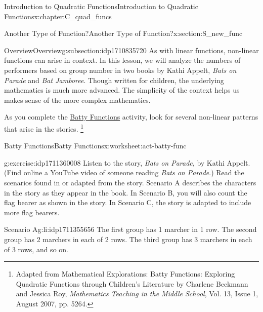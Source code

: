 \documentclass[oneside,10pt,]{book}
\newcommand{\pubtitle}[1]{\textsl{#1}}
\numberwithin{equation}{chapter}
\begin{document}
\begin{chapterptx}{Introduction to Quadratic Functions}{}{Introduction to Quadratic Functions}{}{}{x:chapter:C_quad_funcs}
%
\begin{sectionptx}{Another Type of Function?}{}{Another Type of Function?}{}{}{x:section:S_new_func}
%
%
\typeout{************************************************}
\typeout{************************************************}
%
\begin{subsectionptx}{Overview}{}{Overview}{}{}{g:subsection:idp1710835720}
As with linear functions, non-linear functions can arise in context. In this lesson, we will analyze the numbers of performers based on group number in two books by Kathi Appelt, \pubtitle{Bats on Parade} and \pubtitle{Bat Jamboree}. Though written for children, the underlying mathematics is much more advanced. The simplicity of the context helps us makes sense of the more complex mathematics.%
\par
As you complete the \hyperref[x:worksheet:act-batty-func]{Batty Functions} activity, look for several non-linear patterns that arise in the stories. \footnote{Adapted from Mathematical Explorations: Batty Functions: Exploring Quadratic Functions through Children's Literature by Charlene Beckmann and Jessica Roy, \pubtitle{Mathematics Teaching in the Middle School}, Vol. 13, Issue 1, August 2007, pp. 52\textemdash{}64.\label{g:fn:idp1710835848}}%
\end{subsectionptx}
%
%
\typeout{************************************************}
\typeout{************************************************}
%
\begin{worksheet-subsection}{Batty Functions}{}{Batty Functions}{}{}{x:worksheet:act-batty-func}
\begin{divisionexercise}{1}{}{}{g:exercise:idp1711360008}%
Listen to the story, \pubtitle{Bats on Parade}, by Kathi Appelt. (Find online a YouTube video of someone reading \pubtitle{Bats on Parade}.) Read the scenarios found in or adapted from the story. Scenario A describes the characters in the story as they appear in the book. In Scenario B, you will also count the flag bearer as shown in the story. In Scenario C, the story is adapted to include more flag bearers.%
\begin{descriptionlist}
\begin{dlimedium}{Scenario A}{g:li:idp1711355656}%
The first group has 1 marcher in 1 row. The second group has 2 marchers in each of 2 rows. The third group has 3 marchers in each of 3 rows, and so on.%
\end{dlimedium}%

\end{descriptionlist}
\end{divisionexercise}
\end{worksheet-subsection}
\end{sectionptx}
\end{chapterptx}
\end{document}
